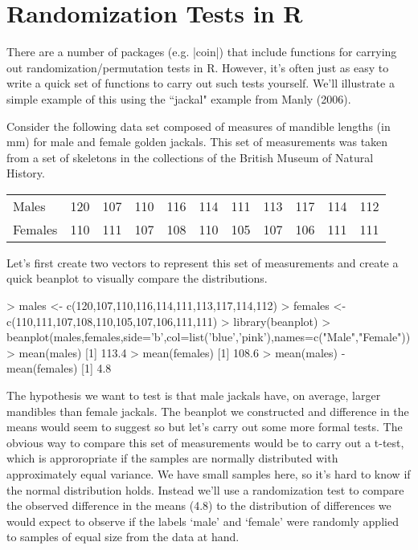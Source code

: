 

\section{Randomization Tests in R}


There are a number of packages (e.g. |coin|) that include functions for carrying out randomization/permutation tests in R. However, it's often just as easy to write a quick set of functions to carry out such tests yourself. We'll illustrate a simple example of this using the ``jackal" example from Manly (2006).

Consider the following data set composed of measures of mandible lengths (in mm) for male and female golden jackals. This set of measurements was taken from a set of skeletons in the collections of the British Museum of Natural History.

\begin{center}
\begin{tabular}{lrrrrrrrrrr}
\hline
Males & 120 & 107 & 110 & 116 & 114 & 111 & 113 & 117 & 114 & 112 \\
Females & 110 & 111 & 107 & 108 & 110 & 105 & 107 & 106 & 111 & 111\\
\hline
\end{tabular}
\end{center}

Let's first create two vectors to represent this set of measurements and create a quick beanplot to visually compare the distributions.

\begin{R}
> males <- c(120,107,110,116,114,111,113,117,114,112)
> females <- c(110,111,107,108,110,105,107,106,111,111)
> library(beanplot)
> beanplot(males,females,side='b',col=list('blue','pink'),names=c("Male","Female"))
> mean(males)
[1] 113.4
> mean(females)
[1] 108.6
> mean(males) - mean(females)
[1] 4.8
\end{R}

The hypothesis we want to test is that male jackals have, on average, larger mandibles than female jackals. The beanplot we constructed and difference in the means would seem to suggest so but let's carry out some more formal tests. The obvious way to compare this set of measurements would be to carry out a t-test, which is approropriate if the samples are normally distributed with approximately equal variance. We have small samples here, so it's hard to know if the normal distribution holds. Instead we'll use a randomization test to compare the observed difference in the means (4.8) to the distribution of differences we would expect to observe if the labels `male' and `female' were randomly applied to samples of equal size from the data at hand.

